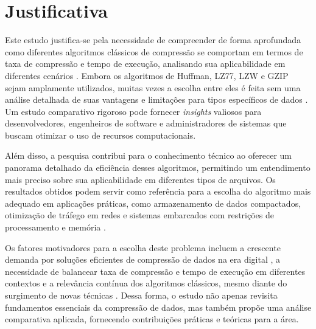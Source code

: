 \chapter{Justificativa}
\label{c.justificativa}

Este estudo justifica-se pela necessidade de compreender de forma aprofundada como diferentes algoritmos clássicos de compressão se comportam em termos de taxa de compressão e tempo de execução, analisando sua aplicabilidade em diferentes cenários \cite{salomon2007data}. Embora os algoritmos de Huffman, LZ77, LZW e GZIP sejam amplamente utilizados, muitas vezes a escolha entre eles é feita sem uma análise detalhada de suas vantagens e limitações para tipos específicos de dados \cite{ziv1977universal, welch1984technique}. Um estudo comparativo rigoroso pode fornecer \textit{insights} valiosos para desenvolvedores, engenheiros de software e administradores de sistemas que buscam otimizar o uso de recursos computacionais.

Além disso, a pesquisa contribui para o conhecimento técnico ao oferecer um panorama detalhado da eficiência desses algoritmos, permitindo um entendimento mais preciso sobre sua aplicabilidade em diferentes tipos de arquivos. Os resultados obtidos podem servir como referência para a escolha do algoritmo mais adequado em aplicações práticas, como armazenamento de dados compactados, otimização de tráfego em redes e sistemas embarcados com restrições de processamento e memória \cite{deutsch1996gzip, collet2016zstandard}.

Os fatores motivadores para a escolha deste problema incluem a crescente demanda por soluções eficientes de compressão de dados na era digital \cite{alakuijala2016brotli}, a necessidade de balancear taxa de compressão e tempo de execução em diferentes contextos e a relevância contínua dos algoritmos clássicos, mesmo diante do surgimento de novas técnicas \cite{collet2016zstandard}. Dessa forma, o estudo não apenas revisita fundamentos essenciais da compressão de dados, mas também propõe uma análise comparativa aplicada, fornecendo contribuições práticas e teóricas para a área.

